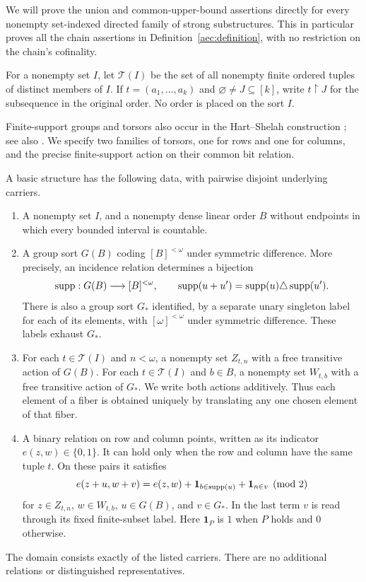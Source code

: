 We will prove the union and common-upper-bound assertions directly for
every nonempty set-indexed directed family of strong substructures.  This
in particular proves all the chain assertions in
Definition~\ref{aec:definition}, with no restriction on the chain's
cofinality.

For a nonempty set \(I\), let \(\mathcal T(I)\) be the set of all
nonempty finite ordered tuples of distinct members of \(I\).
If \(t=(a_1,\ldots,a_k)\) and
\(\varnothing\ne J\subseteq[k]\), write \(t\restriction J\) for the subsequence in
the original order.  No order is placed on the sort \(I\).

Finite-support groups and torsors also occur in the Hart--Shelah
construction \cite[Section~1]{HartShelah1990};
see also \cite[Definition~3.1 and Fact~3.2]{BoneyVasey2018HartShelah}.
We specify two families of torsors, one for rows and one for columns,
and the precise finite-support action on their common bit relation.

\begin{definition}\label{aec:basic}
A basic structure has the following data, with pairwise disjoint
underlying carriers.
\begin{enumerate}[label=\textup{(\alph*)}]
\item A nonempty set \(I\), and a nonempty dense linear order \(B\)
without endpoints in which every bounded interval is countable.
\item A group sort \(G(B)\) coding \([B]^{<\omega}\) under symmetric
difference.  More precisely, an incidence relation determines a
bijection
\[
 \operatorname{supp}:G(B)\longrightarrow[B]^{<\omega},
 \qquad
 \operatorname{supp}(u+u')=\operatorname{supp}(u)\triangle\operatorname{supp}(u').
\]
There is also a group sort \(G_*\) identified, by a separate unary
singleton label for each of its elements, with
\([\omega]^{<\omega}\) under symmetric difference.  These labels
exhaust \(G_*\).
\item For each \(t\in\mathcal T(I)\) and \(n<\omega\), a nonempty
set \(Z_{t,n}\) with a free transitive action of \(G(B)\).  For each
\(t\in\mathcal T(I)\) and \(b\in B\), a nonempty set \(W_{t,b}\)
with a free transitive action of \(G_*\).  We write both actions
additively.  Thus each element of a fiber is obtained uniquely by
translating any one chosen element of that fiber.
\item A binary relation on row and column points, written as its
indicator \(e(z,w)\in\{0,1\}\).  It can hold only when the row and
column have the same tuple \(t\).  On these pairs it satisfies
\begin{equation}\label{aec:bit}
 e(z+u,w+v)
 =
 e(z,w)+\boldsymbol 1_{b\in\operatorname{supp}(u)}
       +\boldsymbol 1_{n\in v}\pmod 2
\end{equation}
for \(z\in Z_{t,n}\), \(w\in W_{t,b}\), \(u\in G(B)\), and
\(v\in G_*\).  In the last term \(v\) is read through its fixed
finite-subset label. Here \(\boldsymbol 1_P\) is \(1\) when
\(P\) holds and \(0\) otherwise.
\end{enumerate}
The domain consists exactly of the listed carriers.  There are no
additional relations or distinguished representatives.
\end{definition}

